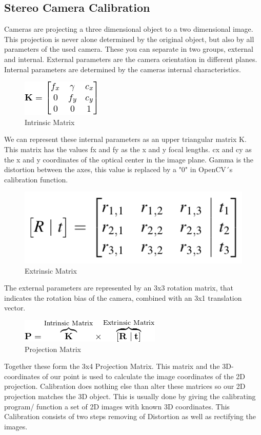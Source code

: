 \documentclass[journal,onecolumn]{IEEEtran}
\begin{document}
\subsection{Stereo Camera Calibration}
\noindent
Cameras are projecting a three dimensional object to a two dimensional image. This projection is never alone determined by the original object, but also by all parameters of the used camera. These you can separate in two groups, external and internal. External parameters are the camera orientation in different planes. Internal parameters are determined by the cameras internal characteristics.
\begin{figure}[H]
	\centering
	\includegraphics[scale=0.8]{intrinsicMatrix.png}
	\captionsetup{justification=centering}
	\caption{Intrinsic Matrix}
\end{figure}
\noindent
We can represent these internal parameters as an upper triangular matrix K. This matrix has the values fx and fy as the x and y focal lengths. cx and cy as the x and y coordinates of the optical center in the image plane. Gamma is the distortion between the axes, this value is replaced by a "0" in OpenCV´s calibration function.\newline
\begin{figure}[H]
	\centering
	\includegraphics[scale=0.4]{extrinsicMatrix.png}
	\captionsetup{justification=centering}
	\caption{Extrinsic Matrix}
\end{figure}
\noindent
The external parameters are represented by an 3x3 rotation matrix, that indicates the rotation bias of the camera, combined with an 3x1 translation vector.\newline
\begin{figure}[H]
	\centering
	\includegraphics[scale=0.7]{projectionMatrix.png}
	\captionsetup{justification=centering}
	\caption{Projection Matrix}
\end{figure}
\noindent
Together these form the 3x4 Projection Matrix. This matrix and the 3D-coordinates of our point is used to calculate the image coordinates of the 2D projection. Calibration does nothing else than alter these matrices so our 2D projection matches the 3D object. This is usually done by giving the calibrating program/ function a set of 2D images with known 3D coordinates.\newline
This Calibration consists of two steps removing of Distortion as well as rectifying the images\cite{ImageRectification}.
\end{document}
